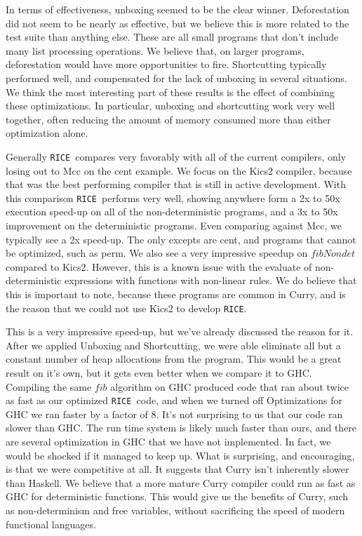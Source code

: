 \documentclass{book}
\newcommand{\rice}{\texttt{RICE}}
\newcommand{\ricesp}{\texttt{RICE }}
\theoremstyle{definition}
\newcommand{\Varid}[1]{\mathit{#1}}
\begin{document}
In terms of effectiveness, unboxing seemed to be the clear winner.
Deforestation did not seem to be nearly as effective, but we believe this
is more related to the test suite than anything else.
These are all small programs that don't include many list processing operations.
We believe that, on larger programs, deforestation would have more opportunities to fire.
Shortcutting typically performed well, and compensated for the lack of unboxing in several situations.
We think the most interesting part of these results is the effect of combining these optimizations.
In particular, unboxing and shortcutting work very well together, 
often reducing the amount of memory consumed more than either optimization alone.

Generally \ricesp compares very favorably with all of the current compilers,
only losing out to Mcc on the cent example.
We focus on the Kics2 compiler, because that was the best performing compiler
that is still in active development.
With this comparison \ricesp performs very well,
showing anywhere form a 2x to 50x execution speed-up on all of the non-deterministic programs,
and a 3x to 50x improvement on the deterministic programs.
Even comparing against Mcc, we typically see a 2x speed-up.
The only excepts are cent, and programs that cannot be optimized, such as perm.
We also see a very impressive speedup on \ensuremath{\Varid{fibNondet}} compared to Kics2.
However, this is a known issue with the evaluate of non-deterministic expressions
with functions with non-linear rules.
We do believe that this is important to note, because these programs are common in Curry,
and is the reason that we could not use Kics2 to develop \rice.

This is a very impressive speed-up, but we've already discussed the reason for it.
After we applied Unboxing and Shortcutting, we were able eliminate all
but a constant number of heap allocations from the program.
This would be a great result on it's own, but it gets even better when we compare it to GHC.
Compiling the same \ensuremath{\Varid{fib}} algorithm on GHC produced code
that ran about twice as fast as our optimized \ricesp code,
and when we turned off Optimizations for GHC we ran faster by a factor of 8.
It's not surprising to us that our code ran slower than GHC.
The run time system is likely much faster than ours,
and there are several optimization in GHC that we have not implemented.
In fact, we would be shocked if it managed to keep up.
What is surprising, and encouraging, is that we were competitive at all.
It suggests that Curry isn't inherently slower than Haskell.
We believe that a more mature Curry compiler could run as fast as GHC for deterministic functions.
This would give us the benefits of Curry, such as non-determinism and free variables,
without sacrificing the speed of modern functional languages.
\end{document}
